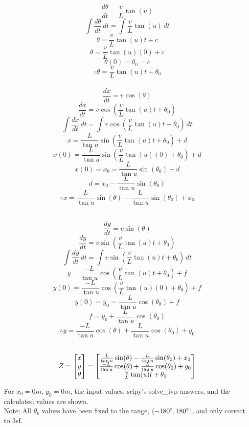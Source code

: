 \documentclass[10pt]{article}
\begin{document}
\[\frac{d\theta}{dt} = \frac{v}{L}\tan(u)\]
\[\int \frac{d\theta}{dt}\,dt = \int \frac{v}{L}\tan(u)\,dt \]
\[\theta = \frac{v}{L}\tan(u)t + c\]
\[\theta = \frac{v}{L}\tan(u)(0) + c\]
\[\theta(0) = \theta_0 = c\]
\[\therefore \theta = \frac{v}{L}\tan(u)t + \theta_0\]\\


\[\frac{dx}{dt} = v\cos(\theta)\]
\[\frac{dx}{dt} = v\cos(\frac{v}{L}\tan(u)t + \theta_0)\]
\[\int \frac{dx}{dt}\, dt = \int v\cos(\frac{v}{L}\tan(u)t + \theta_0)\, dt\]
\[x= \frac{L}{\tan{u}}\sin(\frac{v}{L}\tan(u)t + \theta_0) + d\]
\[x(0)= \frac{L}{\tan{u}}\sin(\frac{v}{L}\tan(u)(0) + \theta_0) + d\]
\[x(0)= x_0 = \frac{L}{\tan{u}}\sin(\theta_0) + d\]
\[d = x_0 - \frac{L}{\tan{u}}\sin(\theta_0)\]
\[\therefore x= \frac{L}{\tan{u}}\sin(\theta) - \frac{L}{\tan{u}}\sin(\theta_0) + x_0\]\\
\label{3:x_prop}

\[\frac{dy}{dt} = v\sin(\theta)\]
\[\frac{dy}{dt} = v\sin(\frac{v}{L}\tan(u)t + \theta_0)\]
\[\int \frac{dy}{dt}\, dt = \int v\sin(\frac{v}{L}\tan(u)t + \theta_0)\, dt\]
\[y = \frac{-L}{\tan{u}}\cos(\frac{v}{L}\tan(u)t + \theta_0) + f\]
\[y(0) = \frac{-L}{\tan{u}}\cos(\frac{v}{L}\tan(u)(0) + \theta_0) + f\]
\[y(0)= y_0 = \frac{-L}{\tan{u}}\cos(\theta_0) + f\]
\[f = y_0 + \frac{L}{\tan{u}}\cos(\theta_0)\]
\[\therefore y= \frac{-L}{\tan{u}}\cos(\theta) + \frac{L}{\tan{u}}\cos(\theta_0) + y_0\]\\
\label{3:y_prop}

\begin{equation*}
Z = 
\begin{bmatrix}
x\\
y\\
\theta
\end{bmatrix}
=
\begin{bmatrix}
\frac{L}{\tan{u}}\sin(\theta) - \frac{L}{\tan{u}}\sin(\theta_0) + x_0\cr
\frac{-L}{\tan{u}}\cos(\theta) + \frac{L}{\tan{u}}\cos(\theta_0) + y_0\cr
\frac{v}{L}\tan(u)t + \theta_0\cr
\end{bmatrix}
\end{equation*}

\bigskip
\noindent
For $x_0 = 0\si{m}$, $y_0 = 0\si{m}$, the input values, scipy's solve\_ivp answers, and the calculated values are shown. \\
Note: All $\theta_0$ values have been fixed to the range, $(-180\degree, 180\degree]$, and only correct to 3sf. \\
\end{document}
